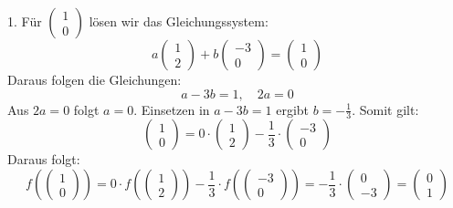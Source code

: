 \documentclass[11pt]{article}
\begin{document}
1. Für \( \begin{pmatrix} 1 \\ 0 \end{pmatrix} \) lösen wir das Gleichungssystem:
\[
a \begin{pmatrix} 1 \\ 2 \end{pmatrix} + b \begin{pmatrix} -3 \\ 0 \end{pmatrix} = \begin{pmatrix} 1 \\ 0 \end{pmatrix}
\]
Daraus folgen die Gleichungen:
\[
a - 3b = 1, \quad 2a = 0
\]
Aus \( 2a = 0 \) folgt \( a = 0 \). Einsetzen in \( a - 3b = 1 \) ergibt \( b = -\frac{1}{3} \). Somit gilt:
\[
\begin{pmatrix} 1 \\ 0 \end{pmatrix} = 0 \cdot \begin{pmatrix} 1 \\ 2 \end{pmatrix} - \frac{1}{3} \cdot \begin{pmatrix} -3 \\ 0 \end{pmatrix}
\]
Daraus folgt:
\[
f\left(\begin{pmatrix} 1 \\ 0 \end{pmatrix}\right) = 0 \cdot f\left(\begin{pmatrix} 1 \\ 2 \end{pmatrix}\right) - \frac{1}{3} \cdot f\left(\begin{pmatrix} -3 \\ 0 \end{pmatrix}\right) = -\frac{1}{3} \cdot \begin{pmatrix} 0 \\ -3 \end{pmatrix} = \begin{pmatrix} 0 \\ 1 \end{pmatrix}
\]
\end{document}
